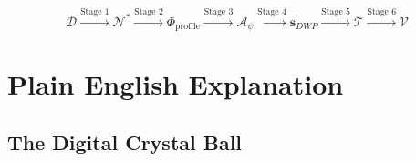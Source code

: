 \documentclass[11pt,twoside]{book}
\newcommand{\Noetics}{\mathcal{N}}
\newcommand{\PsychAttractor}{\mathcal{A}_\psi}
\newcommand{\DigitalTrace}{\mathcal{D}}
\newcommand{\ProfileFrac}{\Phi_{\mathrm{profile}}}
\newcommand{\VulnScore}{\mathcal{V}}
\newcommand{\Timeline}{\mathcal{T}}
\begin{document}
\begin{equation}
\boxed{
\DigitalTrace \xrightarrow{\text{Stage 1}} \Noetics^*
\xrightarrow{\text{Stage 2}} \ProfileFrac
\xrightarrow{\text{Stage 3}} \PsychAttractor
\xrightarrow{\text{Stage 4}} \mathbf{s}_{DWP}
\xrightarrow{\text{Stage 5}} \Timeline
\xrightarrow{\text{Stage 6}} \VulnScore
}
\end{equation}

\part{Plain English Explanation}

\chapter{The Digital Crystal Ball}
\label{ch:plain-english}
\end{document}
